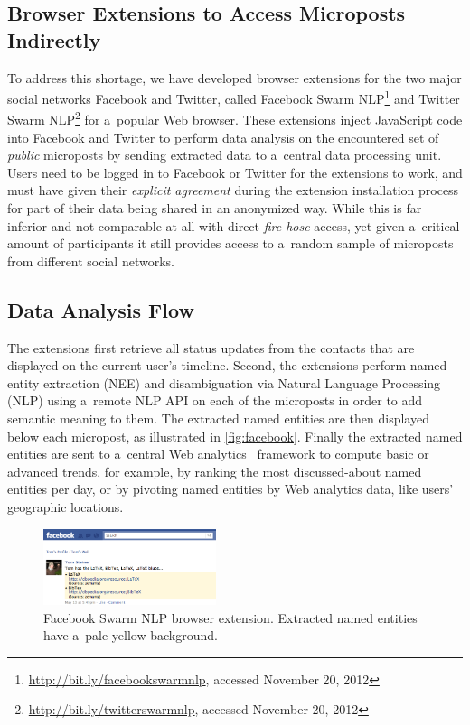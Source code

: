 \subsection{Browser Extensions to Access Microposts Indirectly}

To address this shortage, we have developed browser extensions
for the two major social networks Facebook and Twitter,
called Facebook Swarm
NLP\footnote{\url{http://bit.ly/facebookswarmnlp},
accessed November 20, 2012}
and Twitter Swarm
NLP\footnote{\url{http://bit.ly/twitterswarmnlp},
accessed November 20, 2012}
for a~popular Web browser.
These extensions inject JavaScript code into Facebook and
Twitter to perform data analysis on the encountered set of
\emph{public} microposts by sending extracted data
to a~central data processing unit.
Users need to be logged in to Facebook or Twitter for the 
extensions to work, and must have given
their \emph{explicit agreement} during
the extension installation process
for part of their data being shared in an anonymized way.
While this is far inferior and not comparable at all
with direct \emph{fire hose} access,
yet given a~critical amount of participants
it still provides access to a~random sample of microposts
from different social networks.

\subsection{Data Analysis Flow}

The extensions first retrieve all status updates
from the contacts that are displayed
on the current user's timeline.
Second, the extensions perform named entity extraction (NEE)
and disambiguation via Natural Language Processing (NLP)
using a~remote NLP API on each of the microposts
in order to add semantic meaning to them.
The extracted named entities are then displayed
below each micropost, as illustrated in \autoref{fig:facebook}.
Finally the extracted named entities
are sent to a~central Web analytics~\cite{kaushik2009analytics}
framework to compute basic or advanced trends, for example,
by ranking the most discussed-about named entities per day,
or by pivoting named entities by Web analytics data,
like users' geographic locations.

\begin{figure}[htb!]
  \centering
  \includegraphics[width=0.45\textwidth]{facebook-swarm-nlp.png}
  \caption{Facebook Swarm NLP browser extension.
    Extracted named entities have a~pale yellow background.}     
  \label{fig:facebook}
\end{figure}

